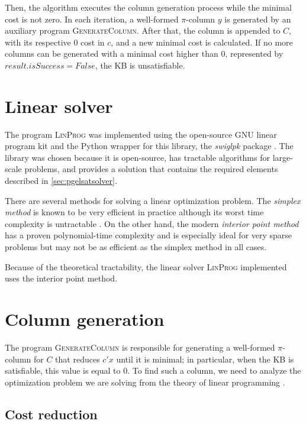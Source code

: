 Then, the algorithm executes the column generation process while the minimal cost is not zero. In each iteration, a well-formed $\pi$-column $y$ is generated by an auxiliary program \textsc{GenerateColumn}. After that, the column is appended to $C$, with its respective $0$ cost in $c$, and a new minimal cost is calculated. If no more columns can be generated with a minimal cost higher than $0$, represented by $result.isSuccess = False$, the KB is unsatisfiable.

\section{Linear solver}
The program \textsc{LinProg} was implemented using the open-source GNU linear program kit \citep{makhorin2001gnu} and the Python wrapper for this library, the \emph{swiglpk} package \citep{swiglpk}. The library was chosen because it is open-source, has tractable algorithms for large-scale problems, and provides a solution that contains the required elements described in \cref{sec:pgelsatsolver}.

There are several methods for solving a linear optimization problem. The \emph{simplex method} is known to be very efficient in practice \citep{borgwardt2012simplex} although its worst time complexity is untractable \citep{klee1972good}. On the other hand, the modern \emph{interior point method} has a proven polynomial-time complexity and is especially ideal for very sparse problems \citep{boyd2004convex} but may not be as efficient as the simplex method in all cases.

Because of the theoretical tractability, the linear solver \textsc{LinProg} implemented uses the interior point method.

\section{Column generation}
The program \textsc{GenerateColumn} is responsible for generating a well-formed $\pi$-column for $C$ that reduces $c' x$ until it is minimal; in particular, when the KB is satisfiable, this value is equal to 0. To find such a column, we need to analyze the optimization problem we are solving from the theory of linear programming \citep{bertsimas1997introduction}.

\subsection{Cost reduction}

